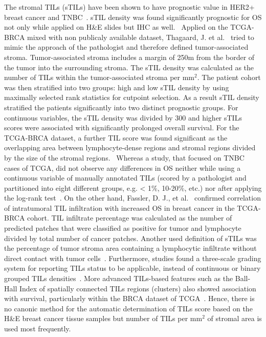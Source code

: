 The stromal TILs (sTILs) have been shown to have prognostic value in HER2+ breast cancer and TNBC~\cite{kos2020pitfalls}. 
sTIL density was found significantly prognostic for OS not only while applied on H\&E slides but IHC as well.~\cite{kapil2021breast}
Applied on the TCGA-BRCA mixed with non publicaly available dataset, Thagaard, J. et al.~\cite{thagaard2021automated} tried to mimic the approach of the pathologist and therefore defined tumor-associated stroma. Tumor-associated stroma includes a margin of 250\textmu m from the border of the tumor into the surrounding stroma. The sTIL density was calculated as the number of TILs within the tumor-associated stroma per mm$^2$. The patient cohort was then stratified into two groups: high and low sTIL density by using maximally selected rank statistics for cutpoint selection. As a result sTIL density stratified the patients significantly into two distinct prognostic groups.  For continuous variables, the sTIL density was divided by 300 and higher sTILs scores were associated with significantly prolonged overall survival. For the TCGA-BRCA dataset, a further TIL score was found significant as the overlapping area between lymphocyte-dense regions and stromal regions divided by the size of the stromal regions.~\cite{sun2021computational}  Whereas a study, that focused on TNBC cases of TCGA, did not observe any differences in OS neither while using a continuous variable of manually annotated TILs (scored by a pathologist and partitioned into eight different groups, e.g. < 1\%, 10-20\%, etc.) nor after applying the log-rank test~\cite{craven2021cibersort}.
On the other hand, Fassler, D. J., et al.~\cite{fassler2022spatial} confirmed correlation of intratumoral TIL infiltration with increased OS in breast cancer in the TCGA-BRCA cohort. TIL infiltrate percentage was calculated as the number of predicted patches that were classified as positive for tumor and lymphocyte divided by total number of cancer patches.
Another used definition of sTILs was the percentage of tumor stroma area containing a lymphocytic infiltrate without direct contact with tumor cells~\cite{meng2018distribution}.
Furthermore, studies found a three-scale grading system for reporting TILs status to be applicable, instead of continuous or binary grouped TILs densities~\cite{kotoula2016tumors}. More advanced TILs-based features such as the Ball-Hall Index of spatially connected TILs regions (clusters) also showed association with survival, particularly within the BRCA dataset of TCGA~\cite{saltz2018spatial}. 
Hence, there is no canonic method for the automatic determination of TILs score based on the H\&E breast cancer tissue samples but number of TILs per mm$^2$ of stromal area is used most frequently.
